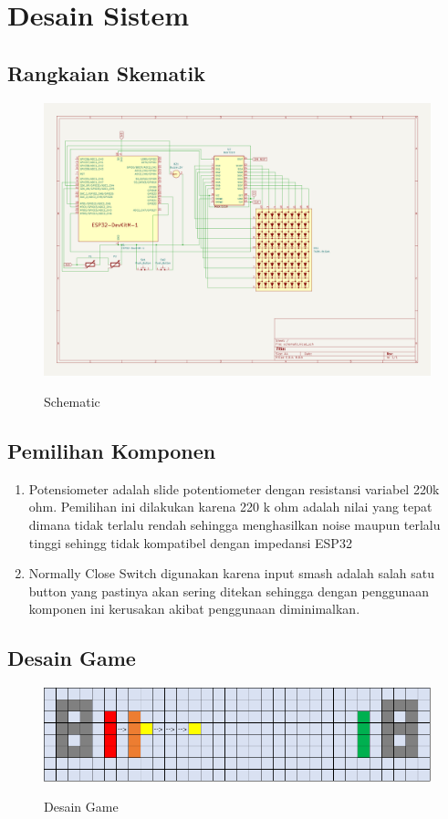 \documentclass[a4paper,12pt]{article}
\begin{document}
\section{Desain Sistem}
\subsection{Rangkaian Skematik}
\begin{figure}[H]
    \centering
    \includegraphics[width=1\textwidth]{images/schematic.png}
    \label{fig:schematic}
    \caption{Schematic}
\end{figure}
\subsection{Pemilihan Komponen}
\begin{enumerate}
    \item Potensiometer adalah slide potentiometer dengan resistansi variabel 220k ohm. Pemilihan ini dilakukan karena
        220 k ohm adalah nilai yang tepat dimana tidak terlalu rendah sehingga menghasilkan noise maupun terlalu tinggi
        sehingg tidak kompatibel dengan impedansi ESP32
    \item Normally Close Switch digunakan karena input smash adalah salah satu button yang pastinya akan
        sering ditekan sehingga dengan penggunaan komponen ini kerusakan akibat penggunaan diminimalkan.
\end{enumerate}

\subsection{Desain Game}
\begin{figure}[h!]
    \centering
    \includegraphics[width=1\textwidth]{images/desain_game.png}
    \label{fig:desaingame}
    \caption{Desain Game}
\end{figure}
\end{document}
